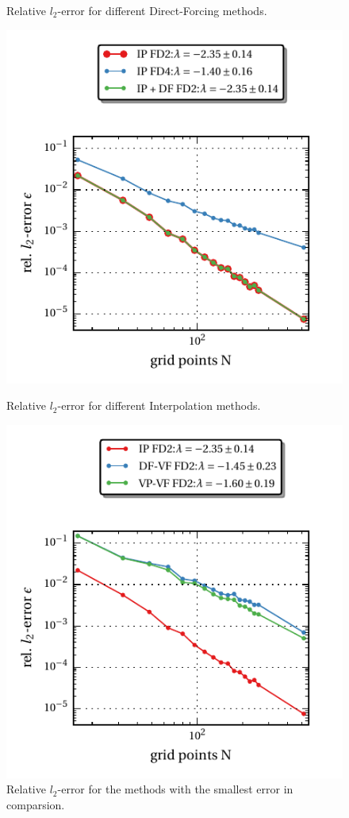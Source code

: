 \begin{figure}[!bp]
\begin{minipage}[c]{0.45\textwidth}
      \caption{\label{vali:hp_flow_gc_df}
          Relative $l_2$-error for different Direct-Forcing methods.}
  \end{minipage}
  \begin{minipage}[c]{0.45\textwidth}
      \includegraphics{gfx/immersed_boundary/hpflow/theo/ip.pdf}
      \caption{\label{vali:hp_flow_gc_ip}
          Relative $l_2$-error for different Interpolation methods.}
  \end{minipage}
  \hfill
  \begin{minipage}[c]{0.45\textwidth}
      \includegraphics{gfx/immersed_boundary/hpflow/theo/all.pdf}
      \caption{\label{vali:hp_flow_gc_all}
          Relative $l_2$-error for the methods with the smallest error in comparsion.}
  \end{minipage}
\end{figure}

